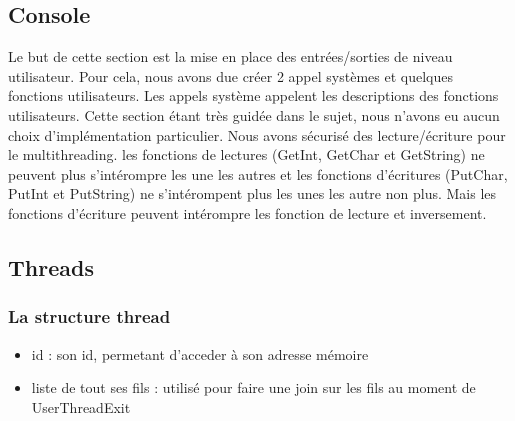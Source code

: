 \documentclass{article}
\begin{document}
	\subsection{Console}
	    {Le but de cette section est la mise en place des entrées/sorties de niveau utilisateur. Pour cela, nous avons due créer 2 appel systèmes et quelques fonctions utilisateurs. Les appels système appelent les descriptions des fonctions utilisateurs. Cette section étant très guidée dans le sujet, nous n'avons eu aucun choix d'implémentation particulier.
	    Nous avons sécurisé des lecture/écriture pour le multithreading. les fonctions de lectures (GetInt, GetChar et GetString) ne peuvent plus s'intérompre les une les autres et les fonctions d'écritures (PutChar, PutInt et PutString) ne s'intérompent plus les unes les autre non plus. Mais les fonctions d'écriture peuvent intérompre les fonction de lecture et inversement.}

	\subsection{Threads}
		\subsubsection{La structure thread}
			\begin{itemize}
				\item id : son id, permetant d'acceder à son adresse mémoire
				\item liste de tout ses fils : utilisé pour faire une join sur les fils au moment de UserThreadExit
			\end{itemize}
\end{document}
